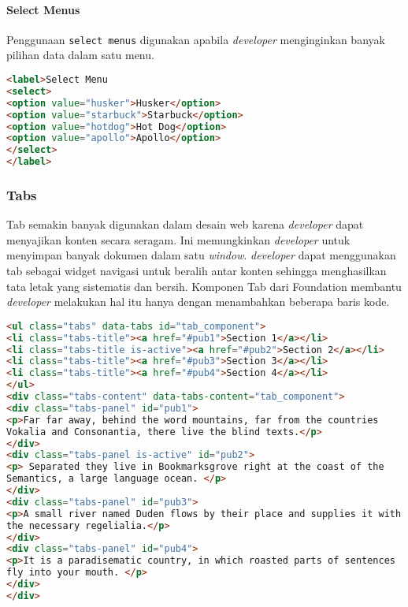 \paragraph{Select Menus}
Penggunaan \texttt{select menus} digunakan apabila \textit{developer} menginginkan banyak pilihan data dalam satu menu.
\begin{lstlisting}[language=HTML,  basicstyle=\ttfamily, frame=single, columns=fullflexible, keepspaces=true, breaklines=true, showstringspaces=false, label={lst:selectMenusFoundation}, caption=Select menus pada foundation 6.] 
<label>Select Menu
<select>
<option value="husker">Husker</option>
<option value="starbuck">Starbuck</option>
<option value="hotdog">Hot Dog</option>
<option value="apollo">Apollo</option>
</select>
</label>
\end{lstlisting}


\subsubsection{Tabs}
Tab semakin banyak digunakan dalam desain web karena \textit{developer} dapat menyajikan konten secara seragam. Ini memungkinkan \textit{developer} untuk menyimpan banyak dokumen dalam satu \textit{window}. \textit{developer} dapat menggunakan tab sebagai widget navigasi untuk beralih antar konten sehingga menghasilkan tata letak yang sistematis dan bersih. Komponen Tab dari Foundation membantu \textit{developer} melakukan hal itu hanya dengan menambahkan beberapa baris kode. 

\begin{lstlisting}[language=HTML,  basicstyle=\ttfamily, frame=single, columns=fullflexible, keepspaces=true, breaklines=true, showstringspaces=false, label={lst:tabsFoundation}, caption=Tabs pada foundation 6.] 
<ul class="tabs" data-tabs id="tab_component">
<li class="tabs-title"><a href="#pub1">Section 1</a></li>
<li class="tabs-title is-active"><a href="#pub2">Section 2</a></li>
<li class="tabs-title"><a href="#pub3">Section 3</a></li>
<li class="tabs-title"><a href="#pub4">Section 4</a></li>
</ul>
<div class="tabs-content" data-tabs-content="tab_component">
<div class="tabs-panel" id="pub1">
<p>Far far away, behind the word mountains, far from the countries
Vokalia and Consonantia, there live the blind texts.</p>
</div>
<div class="tabs-panel is-active" id="pub2">
<p> Separated they live in Bookmarksgrove right at the coast of the
Semantics, a large language ocean. </p>
</div>
<div class="tabs-panel" id="pub3">
<p>A small river named Duden flows by their place and supplies it with
the necessary regelialia.</p>
</div>
<div class="tabs-panel" id="pub4">
<p>It is a paradisematic country, in which roasted parts of sentences
fly into your mouth. </p>
</div>
</div>
\end{lstlisting}

